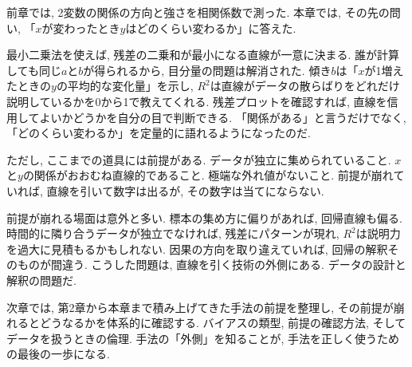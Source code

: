 前章では, 2変数の関係の方向と強さを相関係数で測った.
本章では, その先の問い, 「$x$が変わったとき$y$はどのくらい変わるか」に答えた.

最小二乗法を使えば, 残差の二乗和が最小になる直線が一意に決まる.
誰が計算しても同じ$a$と$b$が得られるから, 目分量の問題は解消された.
傾き$b$は「$x$が1増えたときの$y$の平均的な変化量」を示し, $R^2$は直線がデータの散らばりをどれだけ説明しているかを0から1で教えてくれる.
残差プロットを確認すれば, 直線を信用してよいかどうかを自分の目で判断できる.
「関係がある」と言うだけでなく, 「どのくらい変わるか」を定量的に語れるようになったのだ.

ただし, ここまでの道具には前提がある.
データが独立に集められていること.
$x$と$y$の関係がおおむね直線的であること.
極端な外れ値がないこと.
前提が崩れていれば, 直線を引いて数字は出るが, その数字は当てにならない.

前提が崩れる場面は意外と多い.
標本の集め方に偏りがあれば, 回帰直線も偏る.
時間的に隣り合うデータが独立でなければ, 残差にパターンが現れ, $R^2$は説明力を過大に見積もるかもしれない.
因果の方向を取り違えていれば, 回帰の解釈そのものが間違う.
こうした問題は, 直線を引く技術の外側にある.
データの設計と解釈の問題だ.

次章では, 第2章から本章まで積み上げてきた手法の前提を整理し, その前提が崩れるとどうなるかを体系的に確認する.
バイアスの類型, 前提の確認方法, そしてデータを扱うときの倫理.
手法の「外側」を知ることが, 手法を正しく使うための最後の一歩になる.
